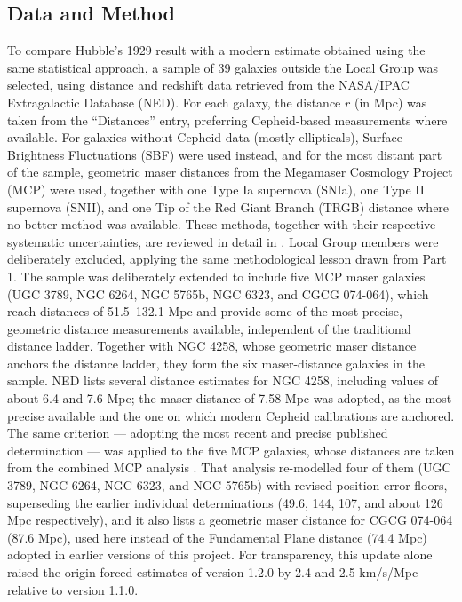 \documentclass[11pt]{article}
\begin{document}
\subsection{Data and Method}
\label{sec:method2}
To compare Hubble's 1929 result with a modern estimate obtained using the same statistical approach, a sample of 39 galaxies outside the Local Group was selected, using distance and redshift data retrieved from the NASA/IPAC Extragalactic Database (NED). For each galaxy, the distance $r$ (in Mpc) was taken from the ``Distances'' entry, preferring Cepheid-based measurements where available. For galaxies without Cepheid data (mostly ellipticals), Surface Brightness Fluctuations (SBF) were used instead, and for the most distant part of the sample, geometric maser distances from the Megamaser Cosmology Project (MCP) \citep{pesce2020} were used, together with one Type Ia supernova (SNIa), one Type II supernova (SNII), and one Tip of the Red Giant Branch (TRGB) distance where no better method was available. These methods, together with their respective systematic uncertainties, are reviewed in detail in \citet{freedman2010}. Local Group members were deliberately excluded, applying the same methodological lesson drawn from Part 1. The sample was deliberately extended to include five MCP maser galaxies (UGC 3789, NGC 6264, NGC 5765b, NGC 6323, and CGCG 074-064), which reach distances of 51.5--132.1 Mpc and provide some of the most precise, geometric distance measurements available, independent of the traditional distance ladder. Together with NGC 4258, whose geometric maser distance anchors the distance ladder, they form the six maser-distance galaxies in the sample. NED lists several distance estimates for NGC 4258, including values of about 6.4 and 7.6 Mpc; the maser distance of 7.58 Mpc \citep{reid2019} was adopted, as the most precise available and the one on which modern Cepheid calibrations are anchored. The same criterion --- adopting the most recent and precise published determination --- was applied to the five MCP galaxies, whose distances are taken from the combined MCP analysis \citep{pesce2020}. That analysis re-modelled four of them (UGC 3789, NGC 6264, NGC 6323, and NGC 5765b) with revised position-error floors, superseding the earlier individual determinations (49.6, 144, 107, and about 126 Mpc respectively), and it also lists a geometric maser distance for CGCG 074-064 (87.6 Mpc), used here instead of the Fundamental Plane distance (74.4 Mpc) adopted in earlier versions of this project. For transparency, this update alone raised the origin-forced estimates of version 1.2.0 by 2.4 and 2.5 km/s/Mpc relative to version 1.1.0.
\end{document}
